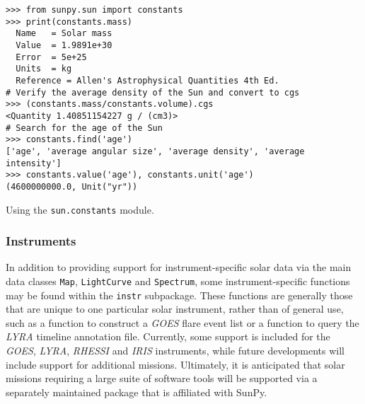\begin{listing}[H]
\begin{verbatim}
>>> from sunpy.sun import constants
>>> print(constants.mass)
  Name   = Solar mass
  Value  = 1.9891e+30
  Error  = 5e+25
  Units  = kg
  Reference = Allen's Astrophysical Quantities 4th Ed.
# Verify the average density of the Sun and convert to cgs
>>> (constants.mass/constants.volume).cgs
<Quantity 1.40851154227 g / (cm3)>
# Search for the age of the Sun
>>> constants.find('age')
['age', 'average angular size', 'average density', 'average intensity']
>>> constants.value('age'), constants.unit('age')
(4600000000.0, Unit("yr"))
\end{verbatim}
\caption{Using the \texttt{sun.constants} module.}
\label{code:constants_code}
\end{listing}
	
\subsubsection{Instruments}\label{ssec:util:inst}
In addition to providing support for instrument-specific solar data via the main data 
classes \texttt{Map}, \texttt{LightCurve} and \texttt{Spectrum}, 
some instrument-specific functions may be found within the \texttt{instr} subpackage. 
These functions are generally those that are unique to one particular solar instrument, 
rather than of general use, such as a function to construct a \textit{GOES} flare event list 
or a function to query the \textit{LYRA} timeline annotation file. Currently, some support is included
 for the \textit{GOES}, \textit{LYRA}, \textit{RHESSI} and \textit{IRIS} instruments, while future developments 
 will include support for additional missions. Ultimately, it is anticipated that solar
  missions requiring a large suite of software tools will be supported via a separately 
  maintained package that is affiliated with SunPy.

